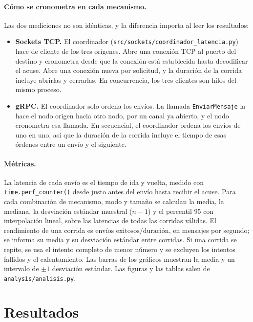\documentclass[11pt,a4paper]{article}
\begin{document}
\paragraph{Cómo se cronometra en cada mecanismo.} Las dos mediciones no son idénticas, y la
diferencia importa al leer los resultados:
\begin{itemize}
  \item \textbf{Sockets TCP.} El coordinador (\texttt{src/sockets/coordinador\_latencia.py})
        hace de cliente de los tres orígenes. Abre una conexión TCP al puerto del destino y
        cronometra desde que la conexión está establecida hasta decodificar el acuse. Abre
        una conexión nueva por solicitud, y la duración de la corrida incluye abrirlas y
        cerrarlas. En concurrencia, los tres clientes son hilos del mismo proceso.
  \item \textbf{gRPC.} El coordinador solo ordena los envíos. La llamada
        \texttt{EnviarMensaje} la hace el nodo origen hacia otro nodo, por un canal ya
        abierto, y el nodo cronometra esa llamada. En secuencial, el coordinador ordena los
        envíos de uno en uno, así que la duración de la corrida incluye el tiempo de esas
        órdenes entre un envío y el siguiente.
\end{itemize}

\paragraph{Métricas.} La latencia de cada envío es el tiempo de ida y vuelta, medido con
\texttt{time.\allowbreak perf\_\allowbreak counter()} desde justo antes del envío hasta recibir el acuse. Para cada
combinación de mecanismo, modo y tamaño se calculan la media, la mediana, la desviación
estándar muestral ($n-1$) y el percentil 95 con interpolación lineal, sobre las latencias
de todas las corridas válidas. El rendimiento de una corrida es
$\text{envíos exitosos} / \text{duración}$, en mensajes por segundo; se informa su media
y su desviación estándar entre corridas. Si una corrida se repite, se usa el intento
completo de menor número y se excluyen los intentos fallidos y el calentamiento. Las
barras de los gráficos muestran la media y un intervalo de $\pm 1$ desviación estándar.
Las figuras y las tablas salen de \texttt{analysis/analisis.py}.

\section{Resultados}
\end{document}
